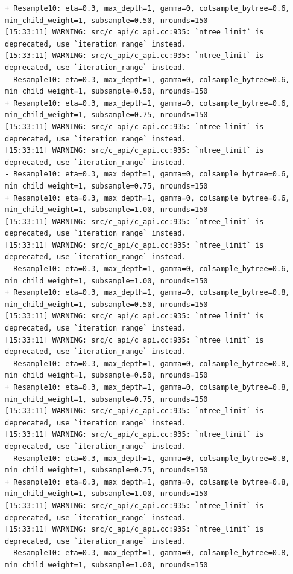 \documentclass[
  letterpaper,
  DIV=11,
  numbers=noendperiod]{scrartcl}
\begin{document}
\begin{verbatim}
+ Resample10: eta=0.3, max_depth=1, gamma=0, colsample_bytree=0.6, min_child_weight=1, subsample=0.50, nrounds=150 
[15:33:11] WARNING: src/c_api/c_api.cc:935: `ntree_limit` is deprecated, use `iteration_range` instead.
[15:33:11] WARNING: src/c_api/c_api.cc:935: `ntree_limit` is deprecated, use `iteration_range` instead.
- Resample10: eta=0.3, max_depth=1, gamma=0, colsample_bytree=0.6, min_child_weight=1, subsample=0.50, nrounds=150 
+ Resample10: eta=0.3, max_depth=1, gamma=0, colsample_bytree=0.6, min_child_weight=1, subsample=0.75, nrounds=150 
[15:33:11] WARNING: src/c_api/c_api.cc:935: `ntree_limit` is deprecated, use `iteration_range` instead.
[15:33:11] WARNING: src/c_api/c_api.cc:935: `ntree_limit` is deprecated, use `iteration_range` instead.
- Resample10: eta=0.3, max_depth=1, gamma=0, colsample_bytree=0.6, min_child_weight=1, subsample=0.75, nrounds=150 
+ Resample10: eta=0.3, max_depth=1, gamma=0, colsample_bytree=0.6, min_child_weight=1, subsample=1.00, nrounds=150 
[15:33:11] WARNING: src/c_api/c_api.cc:935: `ntree_limit` is deprecated, use `iteration_range` instead.
[15:33:11] WARNING: src/c_api/c_api.cc:935: `ntree_limit` is deprecated, use `iteration_range` instead.
- Resample10: eta=0.3, max_depth=1, gamma=0, colsample_bytree=0.6, min_child_weight=1, subsample=1.00, nrounds=150 
+ Resample10: eta=0.3, max_depth=1, gamma=0, colsample_bytree=0.8, min_child_weight=1, subsample=0.50, nrounds=150 
[15:33:11] WARNING: src/c_api/c_api.cc:935: `ntree_limit` is deprecated, use `iteration_range` instead.
[15:33:11] WARNING: src/c_api/c_api.cc:935: `ntree_limit` is deprecated, use `iteration_range` instead.
- Resample10: eta=0.3, max_depth=1, gamma=0, colsample_bytree=0.8, min_child_weight=1, subsample=0.50, nrounds=150 
+ Resample10: eta=0.3, max_depth=1, gamma=0, colsample_bytree=0.8, min_child_weight=1, subsample=0.75, nrounds=150 
[15:33:11] WARNING: src/c_api/c_api.cc:935: `ntree_limit` is deprecated, use `iteration_range` instead.
[15:33:11] WARNING: src/c_api/c_api.cc:935: `ntree_limit` is deprecated, use `iteration_range` instead.
- Resample10: eta=0.3, max_depth=1, gamma=0, colsample_bytree=0.8, min_child_weight=1, subsample=0.75, nrounds=150 
+ Resample10: eta=0.3, max_depth=1, gamma=0, colsample_bytree=0.8, min_child_weight=1, subsample=1.00, nrounds=150 
[15:33:11] WARNING: src/c_api/c_api.cc:935: `ntree_limit` is deprecated, use `iteration_range` instead.
[15:33:11] WARNING: src/c_api/c_api.cc:935: `ntree_limit` is deprecated, use `iteration_range` instead.
- Resample10: eta=0.3, max_depth=1, gamma=0, colsample_bytree=0.8, min_child_weight=1, subsample=1.00, nrounds=150 

\end{verbatim}
\end{document}
